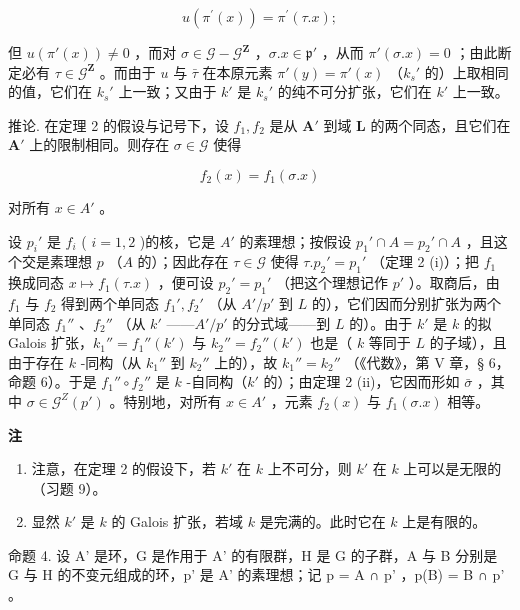 \[
u (\pi^ {\prime} (x)) = \pi^ {\prime} (\tau . x);
\]

  但 \(u(\pi'(x)) \neq 0\) ，而对 \(\sigma \in \mathcal{G} - \mathcal{G}^{\mathbf{Z}}\) ，\(\sigma.x \in \mathfrak{p}'\) ，从而 \(\pi'(\sigma.x) = 0\) ；由此断定必有 \(\tau \in \mathcal{G}^{\mathbf{Z}}\) 。而由于 \(u\) 与 \(\bar{\tau}\) 在本原元素 \(\pi'(y) = \pi'(x)\) （\(k_s'\) 的）上取相同的值，它们在 \(k_s'\) 上一致；又由于 \(k'\) 是 \(k_s'\) 的纯不可分扩张，它们在 \(k'\) 上一致。

推论. 在定理 2 的假设与记号下，设 \(f_1, f_2\) 是从 \(\mathbf{A}'\) 到域 \(\mathbf{L}\) 的两个同态，且它们在 \(\mathbf{A}'\) 上的限制相同。则存在 \(\sigma \in \mathcal{G}\) 使得

\[
f _ {2} (x) = f _ {1} (\sigma . x)
\]

对所有 \(x \in A'\) 。

设 \(p_{i}'\) 是 \(f_{i}\) ( \(i = 1, 2\) )的核，它是 \(A'\) 的素理想；按假设 \(p_{1}' \cap A = p_{2}' \cap A\) ，且这个交是素理想 \(p\) （\(A\) 的）；因此存在 \(\tau \in \mathcal{G}\) 使得 \(\tau. p_{2}' = p_{1}'\) （定理 2 (i)）；把 \(f_{1}\) 换成同态 \(x \mapsto f_{1}(\tau.x)\) ，便可设 \(p_{2}' = p_{1}'\) （把这个理想记作 \(p'\) ）。取商后，由 \(f_{1}\) 与 \(f_{2}\) 得到两个单同态 \(f_{1}', f_{2}'\) （从 \(A'/p'\) 到 \(L\) 的），它们因而分别扩张为两个单同态 \(f_{1}''\) 、\(f_{2}''\) （从 \(k'\) ——\(A'/p'\) 的分式域——到 \(L\) 的）。由于 \(k'\) 是 \(k\) 的拟 Galois 扩张，\(k_{1}'' = f_{1}''(k')\) 与 \(k_{2}'' = f_{2}''(k')\) 也是（ \(k\) 等同于 \(L\) 的子域），且由于存在 \(k\) -同构（从 \(k_{1}''\) 到 \(k_{2}''\) 上的），故 \(k_{1}'' = k_{2}''\) （《代数》，第 V 章，§ 6，命题 6）。于是 \(f_{1}'' \circ f_{2}''\) 是 \(k\) -自同构（\(k'\) 的）；由定理 2 (ii)，它因而形如 \(\bar{\sigma}\) ，其中 \(\sigma \in \mathcal{G}^{Z}(p')\) 。特别地，对所有 \(x \in A'\) ，元素 \(f_{2}(x)\) 与 \(f_{1}(\sigma.x)\) 相等。

\textbf{注}\par

\begin{enumerate}
\def\labelenumi{(\arabic{enumi})}
\item
  注意，在定理 2 的假设下，若 \(k'\) 在 \(k\) 上不可分，则 \(k'\) 在 \(k\) 上可以是无限的（习题 9）。
\item
  显然 \(k'\) 是 \(k\) 的 Galois 扩张，若域 \(k\) 是完满的。此时它在 \(k\) 上是有限的。
\end{enumerate}

命题 4. 设 A' 是环，G 是作用于 A' 的有限群，H 是 G 的子群，A 与 B 分别是 G 与 H 的不变元组成的环，p' 是 A' 的素理想；记 p = A ∩ p' ，p(B) = B ∩ p' 。

